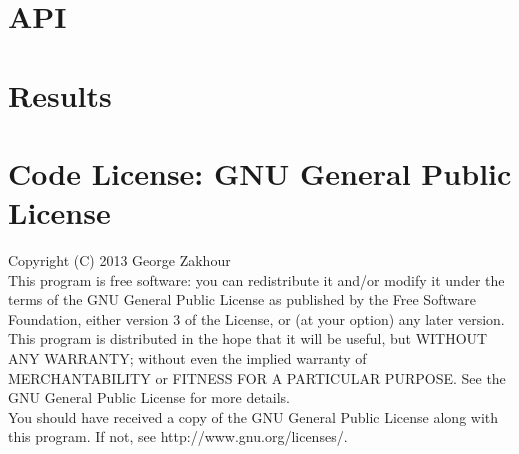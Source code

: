 \documentclass[a4paper, 10pt]{article}
\begin{document}
\newpage
\section{API}

\newpage
\section{Results}

\newpage
\section{Code License: GNU General Public License}
Copyright (C) 2013 George Zakhour\\

This program is free software: you can redistribute it and/or modify it under
the terms of the GNU General Public License as published by the Free Software
Foundation, either version 3 of the License, or (at your option) any later
version.\\

This program is distributed in the hope that it will be useful, but WITHOUT ANY
WARRANTY; without even the implied warranty of MERCHANTABILITY or FITNESS FOR A
PARTICULAR PURPOSE. See the GNU General Public License for more details.\\

You should have received a copy of the GNU General Public License along with
this program. If not, see http://www.gnu.org/licenses/.\\
\end{document}
